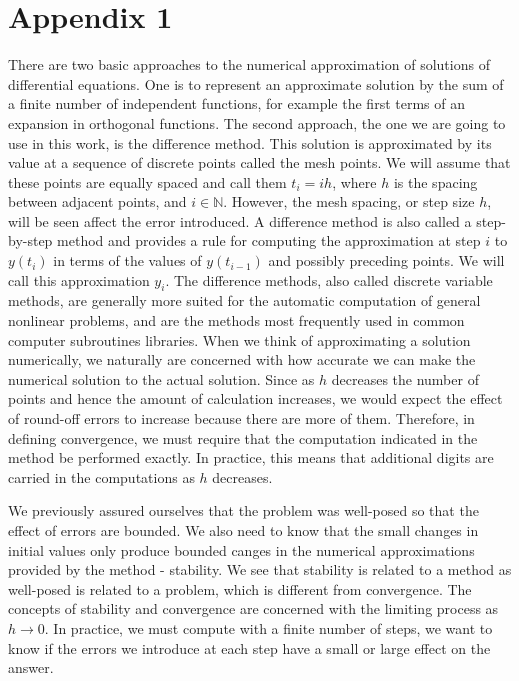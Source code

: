 \chapter{Appendix 1} 
\label{anexo1}
\begin{flushleft}
There are two basic approaches to the numerical approximation of solutions of differential equations. One is to represent an approximate solution by the sum of a finite number of independent functions, for example the first terms of an expansion in orthogonal functions. The second approach, the one we are going to use in this work, is the difference method. This solution is approximated by its value at a sequence of discrete points called the mesh points. We will assume that these points are equally spaced and call them $t_i=ih$, where $h$ is the spacing between adjacent points, and $i\in\mathbb{N}$. However, the mesh spacing, or step size $h$, will be seen affect the error introduced. A difference method is also called a step-by-step method and provides a rule for computing the approximation at step $i$ to $y(t_i)$ in terms of the values of $y(t_{i-1})$ and possibly preceding points. We will call this approximation $y_i$. The difference methods, also called discrete variable methods, are generally more suited for the automatic computation of general nonlinear problems, and are the methods most frequently used in common computer subroutines libraries. When we think of approximating a solution numerically, we naturally are concerned with how accurate we can make the numerical solution to the actual solution. Since as $h$ decreases the number of points and hence the amount of calculation increases, we would expect the effect of round-off errors to increase because there are more of them. Therefore, in defining convergence, we must require that the computation indicated in the method be performed exactly. In practice, this means that additional digits are carried in the computations as $h$ decreases.

We previously assured ourselves that the problem was well-posed so that the effect of errors are bounded. We also need to know that the small changes in initial values only produce bounded canges in the numerical approximations provided by the method - stability. We see that stability is related to a method as well-posed is related to a problem, which is different from convergence. The concepts of stability and convergence are concerned with the limiting process as $h\rightarrow0$. In practice, we must compute with a finite number of steps, we want to know if the errors we introduce at each step have a small or large effect on the answer.
 

\end{flushleft}
